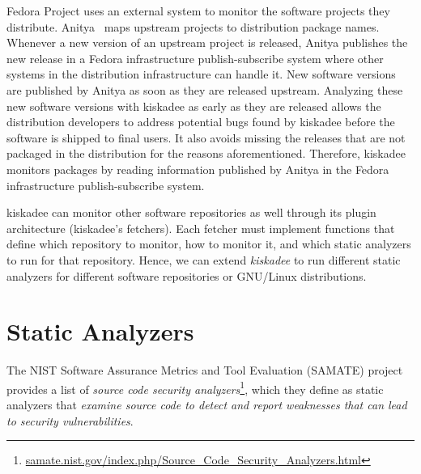 Fedora Project uses an external system to monitor the software projects they
distribute. Anitya~\cite{anitya} maps upstream projects to distribution package
names. Whenever a new version of an upstream project is released, Anitya
publishes the new release in a Fedora infrastructure publish-subscribe system
where other systems in the distribution infrastructure can handle it.  New
software versions are published by Anitya as soon as they are released
upstream. Analyzing these new software versions with kiskadee as early as they
are released allows the distribution developers to address potential bugs found
by kiskadee before the software is shipped to final users. It also avoids
missing the releases that are not packaged in the distribution for the reasons
aforementioned. Therefore, kiskadee monitors packages by reading information
published by Anitya in the Fedora infrastructure publish-subscribe system.

kiskadee can monitor other software repositories as well through its plugin
architecture (kiskadee's fetchers). Each fetcher must implement functions that
define which repository to monitor, how to monitor it, and which static
analyzers to run for that repository. Hence, we can extend \textit{kiskadee} to
run different static analyzers for different software repositories or GNU/Linux
distributions.

\section{Static Analyzers}
\label{sec:analyzers}

The NIST Software Assurance Metrics and Tool Evaluation (SAMATE) project
provides a list of \textit{source code security
analyzers}\footnote{\url{samate.nist.gov/index.php/Source_Code_Security_Analyzers.html}},
which they define as static analyzers that \textit{examine source code to
detect and report weaknesses that can lead to security vulnerabilities}.

